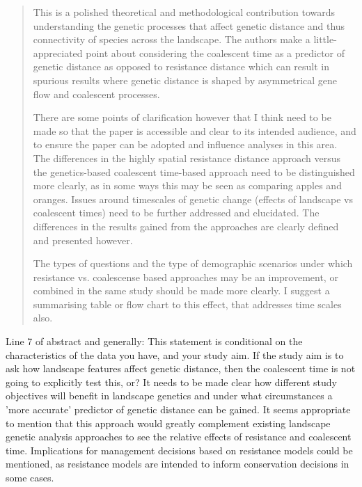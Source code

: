 
\begin{quote}
    This is a polished theoretical and methodological contribution towards
    understanding the genetic processes that affect genetic distance and thus
    connectivity of species across the landscape. The authors make a
    little-appreciated point about considering the coalescent time as a
    predictor of genetic distance as opposed to resistance distance which can
    result in spurious results  where genetic distance is shaped by
    asymmetrical gene flow and coalescent processes.

    There are some points of clarification however that I think need to be made
    so that the paper is accessible and clear to its intended audience, and to
    ensure the paper can be adopted and influence analyses in this area. The
    differences in the highly spatial resistance distance approach versus the
    genetics-based coalescent time-based approach need to be distinguished more
    clearly, as in some ways this may be seen as comparing apples and oranges.
    Issues around timescales of genetic change (effects of landscape vs
    coalescent times) need to be further addressed and elucidated.  The
    differences in the results gained from the approaches are clearly defined
    and presented however.

    The types of questions and the type of demographic scenarios under which
    resistance vs. coalescense based approaches may be an improvement, or
    combined in the same study should be made more clearly. I suggest a
    summarising table or flow chart to this effect, that addresses time scales
    also.
\end{quote}


\begin{point}{Line 7 of abstract and generally:}
This statement is conditional on the characteristics of the data you have, and
    your study aim. If the study aim is to  ask how landscape features affect
    genetic distance, then the coalescent time is not going to explicitly test
    this, or? It needs to be made clear how different study objectives will
    benefit in landscape genetics and under what circumstances a 'more
    accurate' predictor of genetic distance can be gained. It seems appropriate
    to mention that this approach would greatly complement existing landscape
    genetic analysis approaches to see the relative effects of resistance and
    coalescent time. Implications for management decisions based on resistance
    models could be mentioned, as resistance models are intended to inform
    conservation decisions in some cases.
\end{point}

